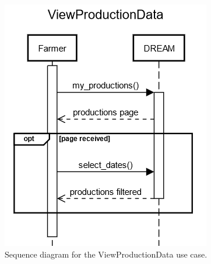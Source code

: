 \documentclass{article}
\begin{document}
\begin{figure}[H]
    \centering
    \includegraphics[scale=0.60]{sequence_diagrams/ViewProductionData.png}
    \caption{Sequence diagram for the ViewProductionData use case.}
\end{figure}
\newpage
\end{document}
